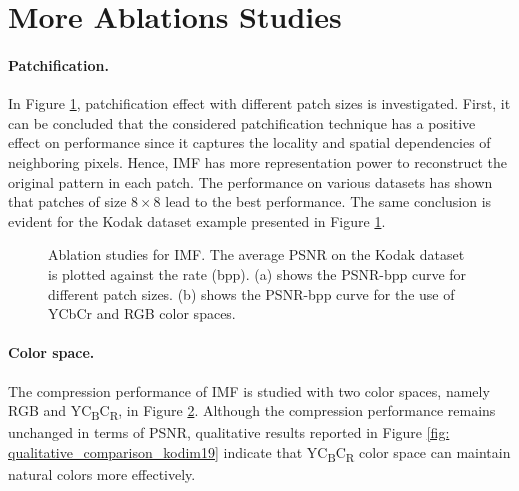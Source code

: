 \section{More Ablations Studies} \label{app: more ablations}

\paragraph{Patchification.} 
In Figure \ref{fig: patch ablation psnr-vs-bpp}, patchification effect with different patch sizes is investigated. First, it can be concluded that the considered patchification technique has a positive effect on performance since it captures the locality and spatial dependencies of neighboring pixels. Hence, IMF has more representation power to reconstruct the original pattern in each patch.
The performance on various datasets has shown that patches of size $8\times 8$ lead to the best performance. The same conclusion is evident for the Kodak dataset example presented in Figure \ref{fig: patch ablation psnr-vs-bpp}.

\begin{figure}[t]
	\centering
	\begin{subfigure}{.45\textwidth}
		\centering
		\resizebox{.95\textwidth}{!}{}
		\caption{}
		\label{fig: patch ablation psnr-vs-bpp}
	\end{subfigure}
    \begin{subfigure}{.45\textwidth}
		\centering
		\resizebox{.95\textwidth}{!}{}
		\caption{}
		\label{fig: colorspace ablation psnr-vs-bpp}
	\end{subfigure}%
	\caption{Ablation studies for IMF. The average PSNR on the Kodak dataset is plotted against the rate (bpp). (a) shows the PSNR-bpp curve for different patch sizes. (b) shows the PSNR-bpp curve for the use of YCbCr and RGB color spaces.
    }
	\label{fig: ablation studies: appen}
\end{figure}


\paragraph{Color space.}
The compression performance of IMF is studied with two color spaces, namely RGB and YC\textsubscript{B}C\textsubscript{R}, in Figure \ref{fig: colorspace ablation psnr-vs-bpp}.
Although the compression performance remains unchanged in terms of PSNR, qualitative results reported in Figure \ref{fig: qualitative_comparison_kodim19} indicate that YC\textsubscript{B}C\textsubscript{R} color space can maintain natural colors more effectively.

